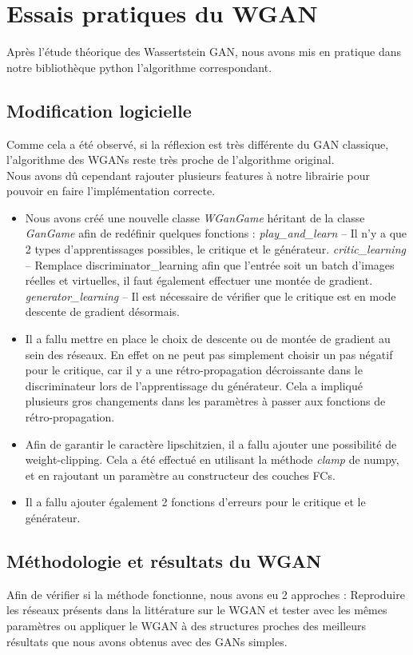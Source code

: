  \section{Essais pratiques du WGAN}
 	Après l'étude théorique des Wassertstein GAN, nous avons mis en pratique dans notre bibliothèque python l'algorithme correspondant.

 \subsection{Modification logicielle}
 	Comme cela a été observé, si la réflexion est très différente du GAN classique, l'algorithme des WGANs reste très proche de l'algorithme original. \\
 	Nous avons dû cependant rajouter plusieurs features à notre librairie pour pouvoir en faire l'implémentation correcte.

 	\begin{itemize}
 		\item Nous avons créé une nouvelle classe \emph{WGanGame} héritant de la classe \emph{GanGame} afin de redéfinir quelques fonctions :
 			\subitem \emph{play\_and\_learn} -- Il n'y a que 2 types d'apprentissages possibles, le critique et le générateur.
 			\subitem \emph{critic\_learning} -- Remplace discriminator\_learning afin que l'entrée soit un batch d'images réelles et virtuelles, il faut également effectuer une montée de gradient.
 			\subitem \emph{generator\_learning}  -- Il est nécessaire de vérifier que le critique est en mode descente de gradient désormais.
 		\item Il a fallu mettre en place le choix de descente ou de montée de gradient au sein des réseaux.
 		En effet on ne peut pas simplement choisir un pas négatif pour le critique, car il y a une rétro-propagation décroissante dans le discriminateur lors de l'apprentissage du générateur. Cela a impliqué plusieurs gros changements dans les paramètres à passer aux fonctions de rétro-propagation.
 		\item Afin de garantir le caractère lipschitzien, il a fallu ajouter une possibilité de weight-clipping. Cela a été effectué en utilisant la méthode \emph{clamp} de numpy, et en rajoutant un paramètre au constructeur des couches FCs.
 		\item Il a fallu ajouter également 2 fonctions d'erreurs pour le critique et le générateur.

 	\end{itemize}
 \subsection{Méthodologie et résultats du WGAN}
 	Afin de vérifier si la méthode fonctionne, nous avons eu 2 approches : Reproduire les réseaux présents dans la littérature sur le WGAN et tester avec les mêmes paramètres ou appliquer le WGAN à des structures proches des meilleurs résultats que nous avons obtenus avec des GANs simples. 

